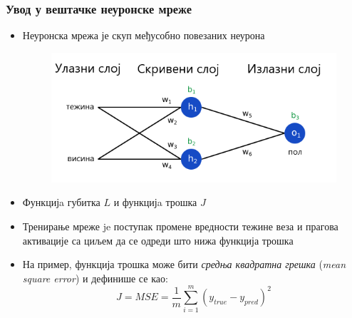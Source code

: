 \begin{frame}
\frametitle{Увод у вештачке неуронске мреже}
\begin{itemize}
 \item \alert{Неуронска мрежа} је скуп међусобно повезаних неурона
 \begin{figure}[H]
  \centering
      \includegraphics[scale=0.35]{slike/neuronskaMrezaOznake.png}
 \end{figure}
 \item \alert{Функцијa губитка} $L$ и \alert{функцијa трошка} $J$
 \item \alert{Тренирање} мреже je поступак промене вредности тежине веза и
прагова активације са циљем да се одреди \alert{што нижа функција трошка}
 \item На пример, функција трошка може бити \alert{\textit{средња квадратна грешка}}
 (\textit{mean square error}) и дефинише се као:
 \begin{equation}
 J = MSE = \frac{1}{m} \sum_{i=1}^{m} (y_{true} - y_{pred})^2
 \end{equation}
\end{itemize}
\end{frame}


